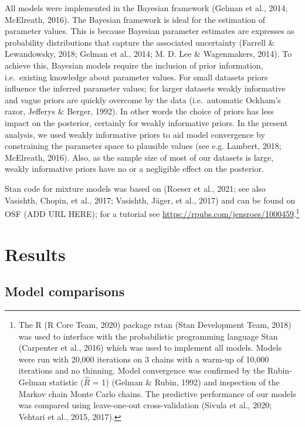 \documentclass[
  man,floatsintext]{apa7}
\begin{document}
All models were implemented in the Bayesian framework (Gelman et al., 2014; McElreath, 2016). The Bayesian framework is ideal for the estimation of parameter values. This is because Bayesian parameter estimates are expresses as probability distributions that capture the associated uncertainty (Farrell \& Lewandowsky, 2018; Gelman et al., 2014; M. D. Lee \& Wagenmakers, 2014). To achieve this, Bayesian models require the inclusion of prior information, i.e.~existing knowledge about parameter values. For small datasets priors influence the inferred parameter values; for larger datasets weakly informative and vague priors are quickly overcome by the data (i.e.~automatic Ockham's razor, Jefferys \& Berger, 1992). In other words the choice of priors has less impact on the posterior, certainly for weakly informative priors. In the present analysis, we used weakly informative priors to aid model convergence by constraining the parameter space to plausible values (see e.g. Lambert, 2018; McElreath, 2016). Also, as the sample size of most of our datasets is large, weakly informative priors have no or a negligible effect on the posterior.

Stan code for mixture models was based on (Roeser et al., 2021; see also Vasishth, Chopin, et al., 2017; Vasishth, Jäger, et al., 2017) and can be found on OSF (ADD URL HERE); for a tutorial see \href{rpubs.com/jensroes/1000459}{https://rpubs.com/jensroes/1000459}.\footnote{The R (R Core Team, 2020) package rstan (Stan Development Team, 2018) was used to interface with the probabilistic programming language Stan (Carpenter et al., 2016) which was used to implement all models. Models were run with 20,000 iterations on 3 chains with a warm-up of 10,000 iterations and no thinning. Model convergence was confirmed by the Rubin-Gelman statistic (\(\hat{R}\) = 1) (Gelman \& Rubin, 1992) and inspection of the Markov chain Monte Carlo chains. The predictive performance of our models was compared using leave-one-out cross-validation (Sivula et al., 2020; Vehtari et al., 2015, 2017).}

\hypertarget{results}{%
\section{Results}\label{results}}

\hypertarget{model-comparisons}{%
\subsection{Model comparisons}\label{model-comparisons}}
\end{document}
